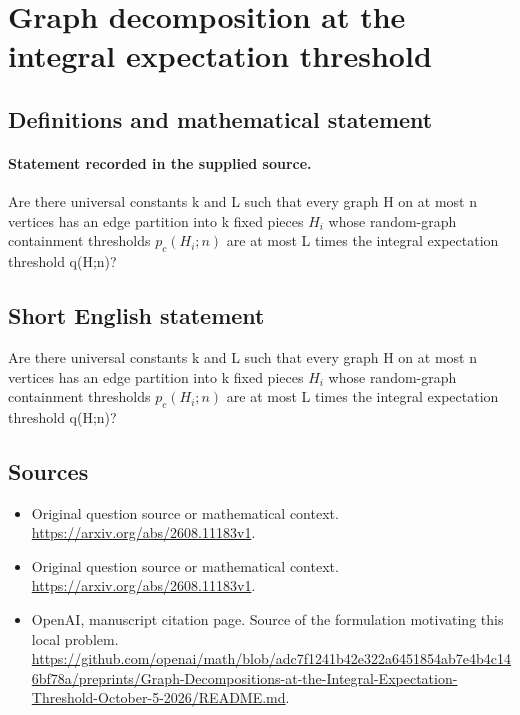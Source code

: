 \documentclass[11pt]{article}
\begin{document}
\section*{Graph decomposition at the integral expectation threshold}\label{30007089}
\subsection{Definitions and mathematical statement}
\paragraph{Statement recorded in the supplied source.}
Are there universal constants k and L such that every graph H on at most n vertices has an edge partition into k fixed pieces $H_i$ whose random-graph containment thresholds $p_c(H_i;n)$ are at most L times the integral expectation threshold q(H;n)?
\subsection{Short English statement}
Are there universal constants k and L such that every graph H on at most n vertices has an edge partition into k fixed pieces $H_i$ whose random-graph containment thresholds $p_c(H_i;n)$ are at most L times the integral expectation threshold q(H;n)?
\subsection{Sources}
\begin{itemize}
\item[S1] Original question source or mathematical context.
\url{https://arxiv.org/abs/2608.11183v1}.
\item[S2] Original question source or mathematical context.
\url{https://arxiv.org/abs/2608.11183v1}.
\item[S3] OpenAI, manuscript citation page. Source of the formulation motivating this local problem.
\url{https://github.com/openai/math/blob/adc7f1241b42e322a6451854ab7e4b4c146bf78a/preprints/Graph-Decompositions-at-the-Integral-Expectation-Threshold-October-5-2026/README.md}.
\end{itemize}
\end{document}
